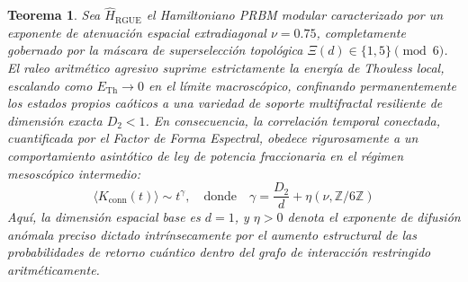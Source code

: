 \documentclass[aps,prl,preprint,superscriptaddress,floatfix]{revtex4-2}
\newtheorem{theorem}{Teorema}[section]
\newcommand{\Zmod}{\mathbb{Z}/6\mathbb{Z}}
\begin{document}
\begin{theorem}
\label{thm:anomalous_diffusion_sff}
Sea $\hat{H}_{\text{RGUE}}$ el Hamiltoniano PRBM modular caracterizado por un exponente de atenuación espacial extradiagonal $\nu = 0.75$, completamente gobernado por la máscara de superselección topológica $\Xi(d) \in \{1,5\} \pmod 6$. El raleo aritmético agresivo suprime estrictamente la energía de Thouless local, escalando como $E_{\text{Th}} \to 0$ en el límite macroscópico, confinando permanentemente los estados propios caóticos a una variedad de soporte multifractal resiliente de dimensión exacta $D_2 < 1$. En consecuencia, la correlación temporal conectada, cuantificada por el Factor de Forma Espectral, obedece rigurosamente a un comportamiento asintótico de ley de potencia fraccionaria en el régimen mesoscópico intermedio:
\begin{equation}
\langle K_{\text{conn}}(t) \rangle \sim t^{\gamma}, \quad \text{donde} \quad \gamma = \frac{D_2}{d} + \eta(\nu, \Zmod)
\end{equation}
Aquí, la dimensión espacial base es $d=1$, y $\eta > 0$ denota el exponente de difusión anómala preciso dictado intrínsecamente por el aumento estructural de las probabilidades de retorno cuántico dentro del grafo de interacción restringido aritméticamente.
\end{theorem}
\end{document}
